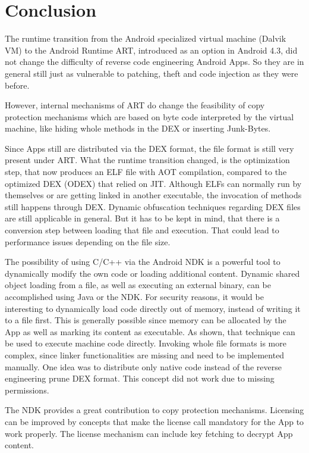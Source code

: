 \chapter{Conclusion}\label{chapter:conclusion}
The runtime transition from the Android specialized virtual machine (Dalvik VM)
to the Android Runtime ART, introduced as an option in Android 4.3, did not change the difficulty of reverse code engineering Android Apps. So they are in general still just as vulnerable to patching, theft and code injection as they were before.

However, internal mechanisms of ART do change the feasibility of copy protection mechanisms which are based on byte code interpreted by the virtual machine, like hiding whole methods in the DEX or inserting Junk-Bytes.

Since Apps still are distributed via the DEX
format, the file format is still very present under ART.
What the runtime transition changed, is the optimization step, that now produces an ELF file with AOT compilation, compared to the optimized
DEX (ODEX) that relied on JIT.
Although ELFs can normally run by themselves or are getting linked in another executable, the invocation of methods still happens through DEX.
Dynamic obfuscation techniques regarding DEX files are still applicable in general. But it has to be kept in mind, that there is a conversion step between loading that file and execution.
That could lead to performance issues depending on the file size.

The possibility of using C/C++ via the Android NDK is a
powerful tool to dynamically modify the own code or loading additional
content.
Dynamic shared object loading from a file, as well as executing an external binary, can be accomplished using Java or the NDK.
For security reasons, it
would be interesting to dynamically load code directly out of memory, instead
of writing it to a file first.
This is generally possible since memory can be allocated by the App as well as marking its content as executable.
As shown, that technique can be used to execute machine code directly. Invoking whole file formats is more complex, since linker functionalities are missing and need to be implemented manually.
One idea was to distribute only native code instead of the reverse engineering prune DEX format. This concept did not work due to missing permissions.

The NDK provides a great contribution to copy protection mechanisms.
Licensing can be improved by concepts that make the license call mandatory for the App to work properly.
The license mechanism can include key fetching to decrypt App content.

